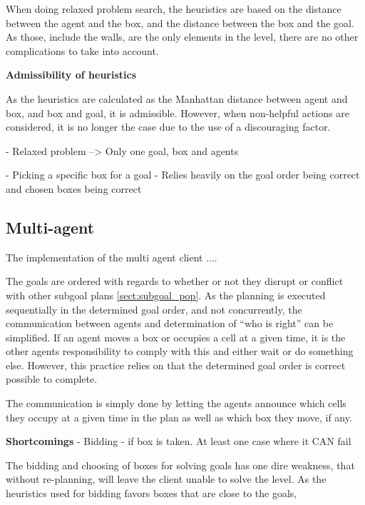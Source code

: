 \documentclass[Main]{subfiles}
\begin{document}
When doing relaxed problem search, the heuristics are based on the distance between the agent and the box, and the distance between the box and the goal. As those, include the walls, are the only elements in the level, there are no other complications to take into account. 



\textbf{Admissibility of heuristics}

As the heuristics are calculated as the Manhattan distance between agent and box, and box and goal, it is admissible. However, when non-helpful actions are considered, it is no longer the case due to the use of a discouraging factor. 



- Relaxed problem --> Only one goal, box and agents

- Picking a specific box for a goal
- Relies heavily on the goal order being correct and chosen boxes being correct





\subsection{Multi-agent} 

The implementation of the multi agent client  .... 



The goals are ordered with regards to whether or not they disrupt or conflict with other subgoal plans \autoref{sect:subgoal_pop}. As the planning is executed sequentially in the determined goal order, and not concurrently, the communication between agents and determination of ``who is right'' can be simplified. 
If an agent moves a box or occupies a cell at a given time, it is the other agents responsibility to comply with this and either wait or do something else. However, this practice relies on that the determined goal order is correct possible to complete. 

The communication is simply done by letting the agents announce which cells they occupy at a given time in the plan as well as which box they move, if any. 



\textbf{Shortcomings}
- Bidding - if box is taken. At least one case where it CAN fail

The bidding and choosing of boxes for solving goals has one dire weakness, that without re-planning, will leave the client unable to solve the level. As the heuristics used for bidding favors boxes that are close to the goals,
\end{document}
